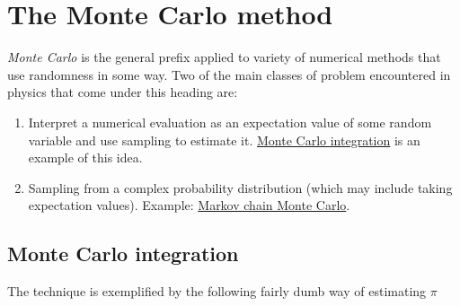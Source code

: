 \documentclass[
  letterpaper,
  DIV=11,
  numbers=noendperiod]{scrreprt}
\theoremstyle{definition}
\theoremstyle{remark}
\begin{document}
\hypertarget{the-monte-carlo-method}{%
\section{The Monte Carlo method}\label{the-monte-carlo-method}}

\emph{Monte Carlo} is the general prefix applied to variety of numerical
methods that use randomness in some way. Two of the main classes of
problem encountered in physics that come under this heading are:

\begin{enumerate}
\def\labelenumi{\arabic{enumi}.}
\item
  Interpret a numerical evaluation as an expectation value of some
  random variable and use sampling to estimate it.
  \href{https://en.wikipedia.org/wiki/Monte_Carlo_integration}{Monte
  Carlo integration} is an example of this idea.
\item
  Sampling from a complex probability distribution (which may include
  taking expectation values). Example:
  \href{https://en.wikipedia.org/wiki/Markov_chain_Monte_Carlo}{Markov
  chain Monte Carlo}.
\end{enumerate}

\hypertarget{monte-carlo-integration}{%
\subsection{Monte Carlo integration}\label{monte-carlo-integration}}

The technique is exemplified by the following fairly dumb way of
estimating \(\pi\)
\end{document}
